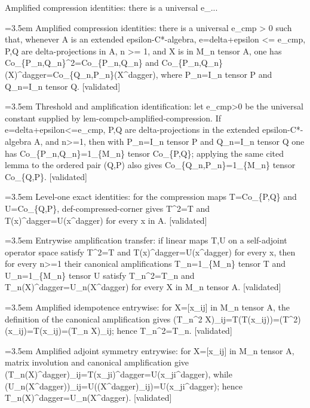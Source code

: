 \documentclass{article}
\newcommand{\step}[1]{\par\noindent\hangindent=3.5em\hangafter=1%
  \makebox[3.5em][l]{\textbf{#1.}}}
\newcommand{\steptag}[1]{\hfill{\small\textsf{[#1]}}}
\begin{document}
\begin{proofbox}{Amplified compression identities: there is a universal e\_...}
\step{1} Amplified compression identities: there is a universal e\_cmp > 0 such that, whenever A is an extended epsilon-C*-algebra, e=delta+epsilon <= e\_cmp, P,Q are delta-projections in A, n >= 1, and X is in M\_n tensor A, one has Co\_\{P\_n,Q\_n\}\textasciicircum{}2=Co\_\{P\_n,Q\_n\} and Co\_\{P\_n,Q\_n\}(X)\textasciicircum{}dagger=Co\_\{Q\_n,P\_n\}(X\textasciicircum{}dagger), where P\_n=I\_n tensor P and Q\_n=I\_n tensor Q. \steptag{validated} \\[6pt]
\step{1.1} Threshold and amplification identification: let e\_cmp>0 be the universal constant supplied by lem-compcb-amplified-compression. If e=delta+epsilon<=e\_cmp, P,Q are delta-projections in the extended epsilon-C*-algebra A, and n>=1, then with P\_n=I\_n tensor P and Q\_n=I\_n tensor Q one has Co\_\{P\_n,Q\_n\}=1\_\{M\_n\} tensor Co\_\{P,Q\}; applying the same cited lemma to the ordered pair (Q,P) also gives Co\_\{Q\_n,P\_n\}=1\_\{M\_n\} tensor Co\_\{Q,P\}. \steptag{validated} \\[4pt]
\step{1.2} Level-one exact identities: for the compression maps T=Co\_\{P,Q\} and U=Co\_\{Q,P\}, def-compressed-corner gives T\textasciicircum{}2=T and T(x)\textasciicircum{}dagger=U(x\textasciicircum{}dagger) for every x in A. \steptag{validated} \\[4pt]
\step{1.3} Entrywise amplification transfer: if linear maps T,U on a self-adjoint operator space satisfy T\textasciicircum{}2=T and T(x)\textasciicircum{}dagger=U(x\textasciicircum{}dagger) for every x, then for every n>=1 their canonical amplifications T\_n=1\_\{M\_n\} tensor T and U\_n=1\_\{M\_n\} tensor U satisfy T\_n\textasciicircum{}2=T\_n and T\_n(X)\textasciicircum{}dagger=U\_n(X\textasciicircum{}dagger) for every X in M\_n tensor A. \steptag{validated} \\[6pt]
\step{1.3.1} Amplified idempotence entrywise: for X=[x\_ij] in M\_n tensor A, the definition of the canonical amplification gives (T\_n\textasciicircum{}2 X)\_ij=T(T(x\_ij))=(T\textasciicircum{}2)(x\_ij)=T(x\_ij)=(T\_n X)\_ij; hence T\_n\textasciicircum{}2=T\_n. \steptag{validated} \\[4pt]
\step{1.3.2} Amplified adjoint symmetry entrywise: for X=[x\_ij] in M\_n tensor A, matrix involution and canonical amplification give (T\_n(X)\textasciicircum{}dagger)\_ij=T(x\_ji)\textasciicircum{}dagger=U(x\_ji\textasciicircum{}dagger), while (U\_n(X\textasciicircum{}dagger))\_ij=U((X\textasciicircum{}dagger)\_ij)=U(x\_ji\textasciicircum{}dagger); hence T\_n(X)\textasciicircum{}dagger=U\_n(X\textasciicircum{}dagger). \steptag{validated} \\[4pt]

\end{proofbox}
\end{document}
